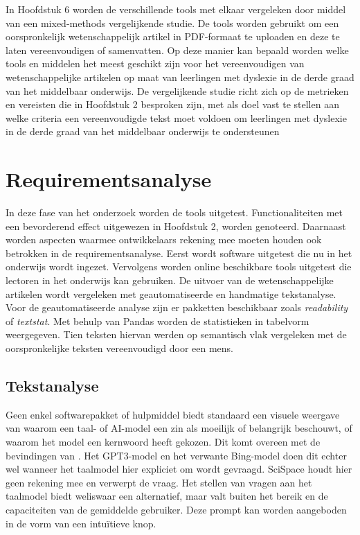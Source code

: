 In Hoofdstuk 6 worden de verschillende tools met elkaar vergeleken door middel van een mixed-methods vergelijkende studie. De tools worden gebruikt om een oorspronkelijk wetenschappelijk artikel in PDF-formaat te uploaden en deze te laten vereenvoudigen of samenvatten. Op deze manier kan bepaald worden welke tools en middelen het meest geschikt zijn voor het vereenvoudigen van wetenschappelijke artikelen op maat van leerlingen met dyslexie in de derde graad van het middelbaar onderwijs. De vergelijkende studie richt zich op de metrieken en vereisten die in Hoofdstuk 2 besproken zijn, met als doel vast te stellen aan welke criteria een vereenvoudigde tekst moet voldoen om leerlingen met dyslexie in de derde graad van het middelbaar onderwijs te ondersteunen

\chapter{Requirementsanalyse}

In deze fase van het onderzoek worden de tools uitgetest. Functionaliteiten met een bevorderend effect uitgewezen in Hoofdstuk 2, worden genoteerd. Daarnaast worden aspecten waarmee ontwikkelaars rekening mee moeten houden ook betrokken in de requirementsanalyse. Eerst wordt software uitgetest die nu in het onderwijs wordt ingezet. Vervolgens worden online beschikbare tools uitgetest die lectoren in het onderwijs kan gebruiken. De uitvoer van de wetenschappelijke artikelen wordt vergeleken met geautomatiseerde en handmatige tekstanalyse. Voor de geautomatiseerde analyse zijn er pakketten beschikbaar zoals \textit{readability} of \textit{textstat}. Met behulp van Pandas worden de statistieken in tabelvorm weergegeven. Tien teksten hiervan werden op semantisch vlak vergeleken met de oorspronkelijke teksten vereenvoudigd door een mens.

\section{Tekstanalyse}

Geen enkel softwarepakket of hulpmiddel biedt standaard een visuele weergave van waarom een taal- of AI-model een zin als moeilijk of belangrijk beschouwt, of waarom het model een kernwoord heeft gekozen. Dit komt overeen met de bevindingen van \textcite{Gooding2019}. Het GPT3-model en het verwante Bing-model doen dit echter wel wanneer het taalmodel hier expliciet om wordt gevraagd. SciSpace houdt hier geen rekening mee en verwerpt de vraag. Het stellen van vragen aan het taalmodel biedt weliswaar een alternatief, maar valt buiten het bereik en de capaciteiten van de gemiddelde gebruiker. Deze prompt kan worden aangeboden in de vorm van een intuïtieve knop. 

